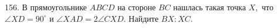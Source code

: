 156. В прямоугольнике $ABCD$ на стороне $BC$ нашлась такая точка $X,$ что $\angle XD = 90^\circ$ и $\angle XAD =2\angle CXD.$ Найдите $BX : XC.$\\
